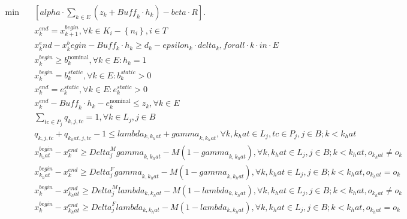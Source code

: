 \begin{align}
  \min\quad & \left[\mathit{alpha} \cdot \sum_{k \in E} \left(\right. z_{k} + \mathit{Buff}_{k} \cdot h_{k} \left.\right) - \mathit{beta} \cdot R\right] . \tag{eq\_0001} \\
  & x_{k}^{e n d} = x_{k + 1}^{b e g i n} , \forall k \in K_{i} - \left\{n_{i}\right\} , i \in T \tag{eq\_0003} \\
  & x_k^end - x_k^begin - Buff_k \cdot h_k \ge d_k - epsilon_k \cdot delta_k, forall \cdot k \cdot in \cdot E \tag{eq\_0004} \\
  & x_{k}^{b e g i n} \geq b_{k}^{\text{nominal}} , \forall k \in E : h_{k} = 1 \tag{eq\_0005} \\
  & x_{k}^{b e g i n} = b_{k}^{s t a t i c} , \forall k \in E : b_{k}^{s t a t i c} > 0 \tag{eq\_0006} \\
  & x_{k}^{e n d} = e_{k}^{s t a t i c} , \forall k \in E : e_{k}^{s t a t i c} > 0 \tag{eq\_0007} \\
  & x_{k}^{e n d} - \mathit{Buff}_{k} \cdot h_{k} - e_{k}^{\text{nominal}} \leq z_{k} , \forall k \in E \tag{eq\_0008} \\
  & \sum_{t c \in P_{j}} q_{k , j , t c} = 1 , \forall k \in L_{j} , j \in B \tag{eq\_0009} \\
  & q_{k , j , t c} + q_{k_hat , j , t c} - 1 \leq \mathit{lambda}_{k , k_hat} + \mathit{gamma}_{k , k_hat} , \forall k , k_hat \in L_{j} , t c \in P_{j} , j \in B ; k < k_hat \tag{eq\_0010} \\
  & x_{k_hat}^{b e g i n} - x_{k}^{e n d} \geq \mathit{Delta}_{j}^{M} \mathit{gamma}_{k , k_hat} - M \left(1 - \mathit{gamma}_{k , k_hat}\right) , \forall k , k_hat \in L_{j} , j \in B ; k < k_hat , o_{k_hat} \neq o_{k} \tag{eq\_0011} \\
  & x_{k_hat}^{b e g i n} - x_{k}^{e n d} \geq \mathit{Delta}_{j}^{F} \mathit{gamma}_{k , k_hat} - M \left(1 - \mathit{gamma}_{k , k_hat}\right) , \forall k , k_hat \in L_{j} , j \in B ; k < k_hat , o_{k_hat} = o_{k} \tag{eq\_0012} \\
  & x_{k}^{b e g i n} - x_{k_hat}^{e n d} \geq \mathit{Delta}_{j}^{M} \mathit{lambda}_{k , k_hat} - M \left(1 - \mathit{lambda}_{k , k_hat}\right) , \forall k , k_hat \in L_{j} , j \in B ; k < k_hat , o_{k_hat} \neq o_{k} \tag{eq\_0013} \\
  & x_{k}^{b e g i n} - x_{k_hat}^{e n d} \geq \mathit{Delta}_{j}^{F} \mathit{lambda}_{k , k_hat} - M \left(1 - \mathit{lambda}_{k , k_hat}\right) , \forall k , k_hat \in L_{j} , j \in B ; k < k_hat , o_{k_hat} = o_{k} \tag{eq\_0014} \\

\end{align}
